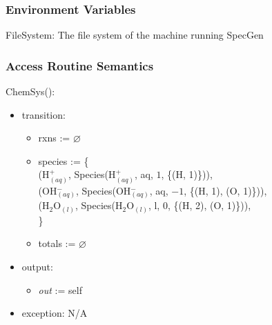 \documentclass[12pt, titlepage]{article}
\newcommand{\progname}{SpecGen}
\begin{document}
\subsubsection{Environment Variables}
FileSystem: The file system of the machine running \progname

\subsubsection{Access Routine Semantics}

\noindent ChemSys():
\begin{itemize}
\item transition: \begin{itemize} 
                  \item[] rxns := $\varnothing$
                  \item[] species := \{ \\
                  \hspace*{2em} (H$^+_{(aq)}$, Species(H$^+_{(aq)}$, aq, $1$, \{(H, 1)\})),\\
                  \hspace*{2em} (OH$^-_{(aq)}$, Species(OH$^-_{(aq)}$, aq, $-1$, \{(H, 1), (O, 1)\})),\\
                  \hspace*{2em} (H$_2$O$_{(l)}$, Species(H$_2$O$_{(l)}$, l, $0$, \{(H, 2), (O, 1)\})),\\
                  \} 
                  \item[] totals := $\varnothing$
                  \end{itemize}
\item output: \begin{itemize} 
              \item[] \emph{out} := self 
              \end{itemize}
\item exception: N/A
\end{itemize}
\end{document}
